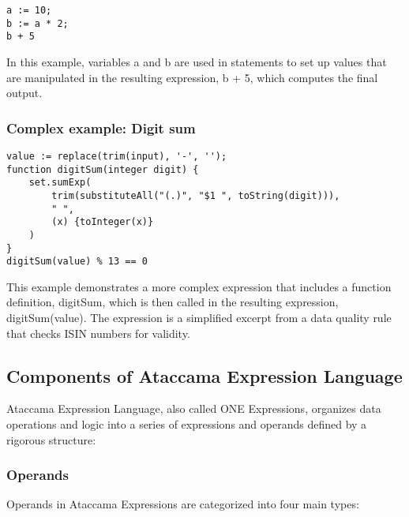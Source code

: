 \begin{verbatim}
a := 10;  
b := a * 2; 
b + 5
\end{verbatim}

In this example, variables a and b are used in statements to set up values that are manipulated in the resulting expression, b + 5, which computes the final output.

\subsubsection{Complex example: Digit sum}

\begin{verbatim}
value := replace(trim(input), '-', '');
function digitSum(integer digit) { 
    set.sumExp(
        trim(substituteAll("(.)", "$1 ", toString(digit))), 
        " ", 
        (x) {toInteger(x)}
    )
}
digitSum(value) % 13 == 0
\end{verbatim}

This example demonstrates a more complex expression that includes a function definition, digitSum, which is then called in the resulting expression, digitSum(value). The expression is a simplified excerpt from a data quality rule that checks ISIN numbers for validity.

\subsection{Components of Ataccama Expression Language}

Ataccama Expression Language, also called ONE Expressions, organizes data operations and logic into a series of expressions and operands defined by a rigorous structure:

\subsubsection{Operands}

Operands in Ataccama Expressions are categorized into four main types:


